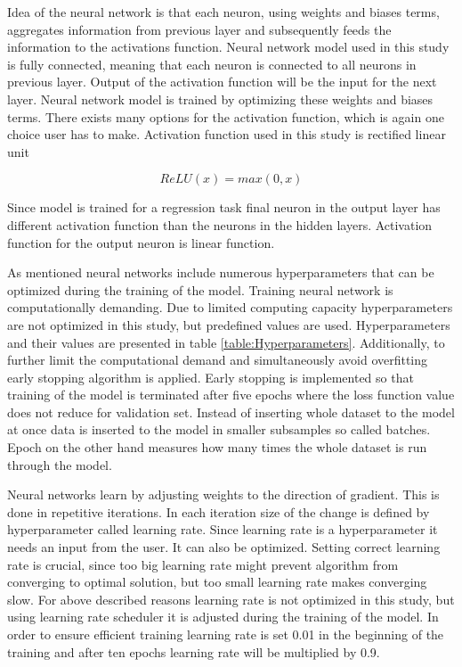 \documentclass{article}
\begin{document}
Idea of the neural network is that each neuron, using weights and biases terms, aggregates information from previous layer and subsequently feeds the information to the activations function. Neural network model used in this study is fully connected, meaning that each neuron is connected to all neurons in previous layer. Output of the activation function will be the input for the next layer. Neural network model is trained by optimizing these weights and biases terms. There exists many options for the activation function, which is again one choice user has to make. Activation function used in this study is rectified linear unit \par

\begin{equation}
\label{ReLU}
ReLU(x) = max(0, x)
\end{equation}

Since model is trained for a regression task final neuron in the output layer has different activation function than the neurons in the hidden layers. Activation function for the output neuron is linear function. \par

As mentioned neural networks include numerous hyperparameters that can be optimized during the training of the model. Training neural network is computationally demanding. Due to limited computing capacity hyperparameters are not optimized in this study, but predefined values are used. Hyperparameters and their values are presented in table \ref{table:Hyperparameters}. Additionally, to further limit the computational demand and simultaneously avoid overfitting early stopping algorithm is applied. Early stopping is implemented so that training of the model is terminated after five epochs where the loss function value does not reduce for validation set. Instead of inserting whole dataset to the model at once data is inserted to the model in smaller subsamples so called batches. Epoch on the other hand measures how many times the whole dataset is run through the model. \par

Neural networks learn by adjusting weights to the direction of gradient. This is done in repetitive iterations. In each iteration size of the change is defined by hyperparameter called learning rate. Since learning rate is a hyperparameter it needs an input from the user. It can also be optimized. Setting correct learning rate is crucial, since too big learning rate might prevent algorithm from converging to optimal solution, but too small learning rate makes converging slow. For above described reasons learning rate is not optimized in this study, but using learning rate scheduler it is adjusted during the training of the model. In order to ensure efficient training learning rate is set 0.01 in the beginning of the training and after ten epochs learning rate will be multiplied by 0.9. \par
\end{document}
